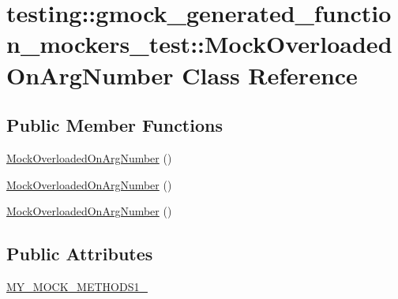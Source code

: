 \hypertarget{classtesting_1_1gmock__generated__function__mockers__test_1_1_mock_overloaded_on_arg_number}{}\section{testing\+::gmock\+\_\+generated\+\_\+function\+\_\+mockers\+\_\+test\+::Mock\+Overloaded\+On\+Arg\+Number Class Reference}
\label{classtesting_1_1gmock__generated__function__mockers__test_1_1_mock_overloaded_on_arg_number}
\subsection*{Public Member Functions}
\begin{DoxyCompactItemize}
\item 
\mbox{\hyperlink{classtesting_1_1gmock__generated__function__mockers__test_1_1_mock_overloaded_on_arg_number_ad5b40981c39bc0bec3b63632cf827153}{Mock\+Overloaded\+On\+Arg\+Number}} ()
\item 
\mbox{\hyperlink{classtesting_1_1gmock__generated__function__mockers__test_1_1_mock_overloaded_on_arg_number_ad5b40981c39bc0bec3b63632cf827153}{Mock\+Overloaded\+On\+Arg\+Number}} ()
\item 
\mbox{\hyperlink{classtesting_1_1gmock__generated__function__mockers__test_1_1_mock_overloaded_on_arg_number_ad5b40981c39bc0bec3b63632cf827153}{Mock\+Overloaded\+On\+Arg\+Number}} ()
\end{DoxyCompactItemize}
\subsection*{Public Attributes}
\begin{DoxyCompactItemize}
\item 
\mbox{\hyperlink{classtesting_1_1gmock__generated__function__mockers__test_1_1_mock_overloaded_on_arg_number_a5076ebd17fb1cc93952b4a80fe6de894}{M\+Y\+\_\+\+M\+O\+C\+K\+\_\+\+M\+E\+T\+H\+O\+D\+S1\+\_\+}}
\end{DoxyCompactItemize}
